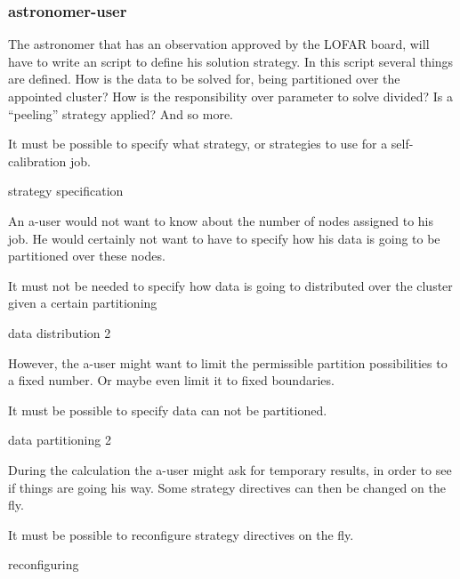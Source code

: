 \documentclass[]{lofar}
\begin{document}
      \subsubsection{astronomer-user}

        The astronomer that has an observation approved by the LOFAR
        board, will have to write an script to define his solution
        strategy. In this script several things are defined. How is the data to be
        solved for, being partitioned over the appointed cluster? How
        is the responsibility over parameter to solve divided? Is a
        ``peeling'' strategy applied? And so more.

        \begin{requirement}
          It must be possible to specify what strategy, or strategies
          to use for a self-calibration job.
          \caption{strategy specification\label{req:strategy-specification}}
        \end{requirement}

        An a-user would not want to know about the number of nodes
        assigned to his job. He would certainly not want to have to
        specify how his data is going to be partitioned over these
        nodes. 

        \begin{requirement}
          It must not be needed to specify how data is going to
          distributed over the cluster given a certain partitioning
          \caption{data distribution 2\label{req:data-distribution-2}}
        \end{requirement}

        However, the a-user might want to limit the permissible
        partition possibilities to a fixed number. Or maybe even limit
        it to fixed boundaries.

        \begin{requirement}
          It must be possible to specify data can not be partitioned.
          \caption{data partitioning 2\label{req:data-partitioning-2}}
        \end{requirement}

        During the calculation the a-user might ask for temporary
        results, in order to see if things are going his way. Some
        strategy directives can then be changed on the fly.

        \begin{requirement}
          It must be possible to reconfigure strategy directives on
          the fly.
          \caption{reconfiguring\label{req:reconfiguring}}
        \end{requirement}
\end{document}
